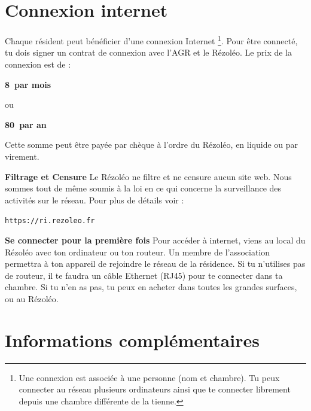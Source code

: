 \documentclass[12pt]{article}
\begin{document}
\section{Connexion internet}
  Chaque résident peut bénéficier d’une connexion Internet \footnote{Une connexion est associée à une personne (nom et chambre). Tu peux connecter au réseau plusieurs ordinateurs ainsi que te connecter librement depuis une chambre différente de la tienne.}. Pour être connecté, tu dois signer un contrat de connexion avec l’AGR  et le Rézoléo. Le prix de la connexion est de :
  {\begin{center}
    \textbf{8\EUR~par mois}
  \end{center}
  \centerline{ou}
  \begin{center}
    \textbf{80\EUR~par an}
  \end{center}

  Cette somme peut être payée par chèque à l’ordre du Rézoléo, en liquide ou par virement.
  \begin{description}
    \item \textbf{Filtrage et Censure}\vspace*{0.5cm} \newline Le Rézoléo ne filtre et ne censure aucun site web. Nous sommes tout de même soumis à la loi en ce qui concerne la surveillance des activités sur le réseau. Pour plus de détails voir :
    \begin{center}
      \verb|https://ri.rezoleo.fr|
    \end{center}
    \item \textbf{Se connecter pour la première fois}\vspace*{0.5cm} \newline Pour accéder à internet, viens au local du Rézoléo avec ton ordinateur ou ton routeur. Un membre de l’association permettra à ton appareil de rejoindre le réseau de la résidence. Si tu n'utilises pas de routeur, il te faudra un câble Ethernet (RJ45) pour te connecter dans ta chambre. Si tu n’en as pas, tu peux en acheter dans toutes les grandes surfaces, ou au Rézoléo.

  \end{description}

\section{Informations complémentaires}

}
\end{document}
